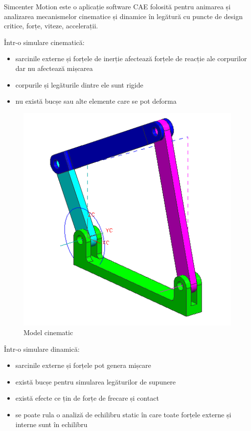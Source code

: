 Simcenter Motion este o aplicație software CAE folosită pentru animarea și analizarea mecanismelor cinematice și dinamice în 
legătură cu puncte de design critice, forțe, viteze, accelerații.\newline

Într-o simulare cinematică:
\begin{itemize}
    \item sarcinile externe și forțele de inerție afectează forțele de reacție ale corpurilor dar nu afectează mișcarea
    \item corpurile și legăturile dintre ele sunt rigide
    \item nu există bucșe sau alte elemente care se pot deforma
\end{itemize}

\begin{figure}[H]
    \begin{center}
        \includegraphics[scale=0.7]{imagini/simcenter/cinematica.png}
        \caption{Model cinematic \protect\footnotemark}
        \label{fig:cinematic}
    \end{center}    
\end{figure}


\newpage

Într-o simulare dinamică:
\begin{itemize}
    \item sarcinile externe și forțele pot genera mișcare
    \item există bucșe pentru simularea legăturilor de supunere
    \item există efecte ce țin de forțe de frecare și contact 
    \item se poate rula o analiză de echilibru static în care toate forțele externe și interne sunt în echilibru
\end{itemize}

